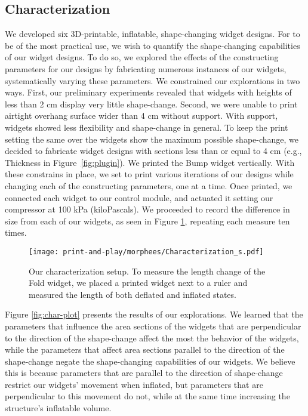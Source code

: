     \subsection{Characterization} \label{sec:widgets}
      We developed six 3D-printable, inflatable, shape-changing widget designs.
      For \mp to be of the most practical use, we wish to quantify the
      shape-changing capabilities of our widget designs. To do so, we explored
      the effects of the constructing parameters for our designs by fabricating
      numerous instances of our widgets, systematically varying these
      parameters. We constrained our explorations in two ways. First, our
      preliminary experiments revealed that widgets with heights of less than 2
      cm display very little shape-change. Second, we were unable to print
      airtight overhang surface wider than 4 cm without support. With support,
      widgets showed less flexibility and shape-change in general. To keep the
      print setting the same over the widgets show the maximum possible
      shape-change, we decided to fabricate widget designs with sections less
      than or equal to 4 cm (e.g., Thickness in Figure~\ref{fig:plugin}). We
      printed the Bump widget vertically. With these constrains in place, we set
      to print various iterations of our designs while changing each of the
      constructing parameters, one at a time. Once printed, we connected each
      widget to our control module, and actuated it setting our compressor at
      100 kPa (kiloPascals). We proceeded to record the difference in size from
      each of our widgets, as seen in Figure \ref{fig:widget-char}, repeating
      each measure ten times.
        
      \begin{figure}[htb]
        \centering
        \texttt{[image: print-and-play/morphees/Characterization\_s.pdf]}
        \caption{Our characterization setup. To measure the length change of the
          Fold widget, we placed a printed widget next to a ruler and measured the
          length of both deflated and inflated states.}
        \label{fig:widget-char}
      \end{figure}

      Figure \ref{fig:char-plot} presents the results of our explorations. We
      learned that the parameters that influence the area sections of the
      widgets that are perpendicular to the direction of the shape-change affect
      the most the behavior of the widgets, while the parameters that affect
      area sections parallel to the direction of the shape-change negate the
      shape-changing capabilities of our widgets. We believe this is because
      parameters that are parallel to the direction of shape-change restrict our
      widgets' movement when inflated, but parameters that are perpendicular to
      this movement do not, while at the same time increasing the structure's
      inflatable volume.
        
